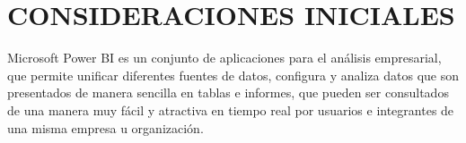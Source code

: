 \documentclass[12pt,letterpaper]{article}
\begin{document}
    \section{CONSIDERACIONES INICIALES}
    Microsoft Power BI es un conjunto de aplicaciones para el análisis empresarial, que permite unificar diferentes fuentes de datos, configura y analiza datos que son presentados de manera sencilla en tablas e informes, que pueden ser consultados de una manera muy fácil y atractiva en tiempo real por usuarios e integrantes de una misma empresa u organización.
    \newpage
\end{document}
